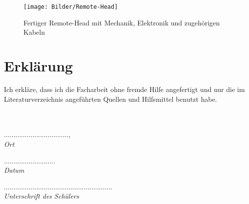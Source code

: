 \documentclass[a4paper, 12pt, bibliography=totocnumbered, listof=numbered]{scrartcl}
\begin{document}
	\begin{figure}[htb]
		\centering
		\texttt{[image: Bilder/Remote-Head]}
		\caption{Fertiger Remote-Head mit Mechanik, Elektronik und zugehörigen Kabeln}
	\end{figure}

	\pagebreak

	\nocite{*}
	
	

	\pagebreak

	\listoffigures
	\listsubcaptions

	\pagebreak

	\section*{Erklärung}
	Ich erkläre, dass ich die Facharbeit ohne fremde Hilfe angefertigt und nur die im Literaturverzeichnis angeführten Quellen und Hilfsmittel benutzt habe.\\
	\\
	\\
	\begin{minipage}{3cm}
		..................................,\\
		\it{Ort}
	\end{minipage}
	\hspace{1.5cm}
	\begin{minipage}{2cm}
		...........................\\
		\it{Datum}
	\end{minipage}
	\hspace{1.5cm}
	\begin{minipage}{8cm}
		.........................................................\\
		\it{Unterschrift des Schülers}
	\end{minipage}
\end{document}
